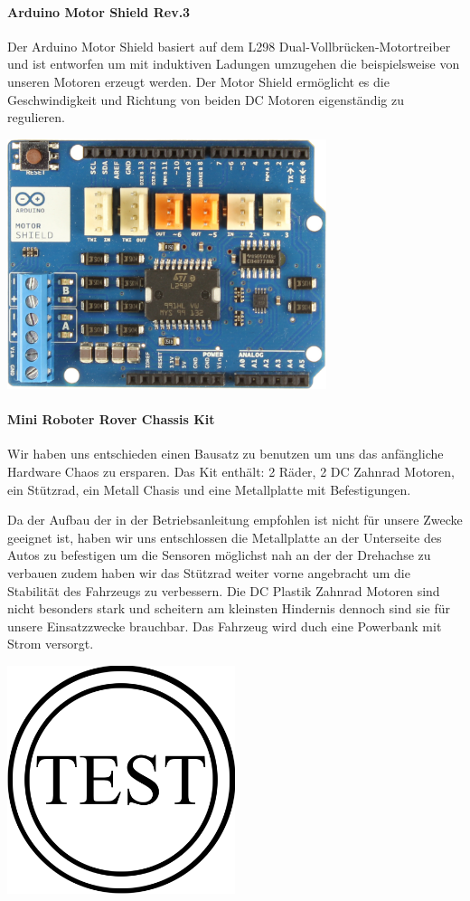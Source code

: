 \documentclass[12pt]{article}
\begin{document}
\paragraph{Arduino Motor Shield Rev.3} Der Arduino Motor Shield basiert auf dem L298 Dual-Vollbrücken-Motortreiber und ist entworfen um mit induktiven Ladungen umzugehen die beispielsweise von unseren Motoren erzeugt werden. Der Motor Shield ermöglicht es die Geschwindigkeit und Richtung von beiden DC Motoren eigenständig zu regulieren.

\vspace{0.5cm}
\includegraphics[width=0.7\textwidth]{images/MotorShield_Front.jpg}\par
\cite{motorShield-front}

\paragraph{Mini Roboter Rover Chassis Kit} Wir haben uns entschieden einen Bausatz zu benutzen um uns das anfängliche Hardware Chaos zu ersparen. Das Kit enthält: 2 Räder, 2 DC Zahnrad Motoren, ein Stützrad, ein Metall Chasis und eine Metallplatte mit Befestigungen.

Da der Aufbau der in der Betriebsanleitung empfohlen ist nicht für unsere Zwecke geeignet ist, haben wir uns entschlossen die Metallplatte an der Unterseite des Autos zu befestigen um die Sensoren möglichst nah an der der Drehachse zu verbauen zudem haben wir das Stützrad weiter vorne angebracht um die Stabilität des Fahrzeugs zu verbessern. Die DC Plastik Zahnrad Motoren sind nicht besonders stark und scheitern am kleinsten Hindernis dennoch sind sie für unsere Einsatzzwecke brauchbar. Das Fahrzeug wird duch eine Powerbank mit Strom versorgt.
\vspace{0.5cm}

\includegraphics[width=0.5\textwidth]{images/example.png}
\newpage
\end{document}

